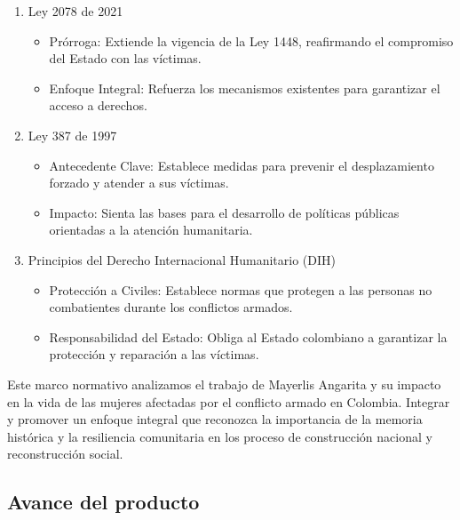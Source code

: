 \documentclass[letterpaper, 12pt]{article}
\begin{document}
\begin{enumerate}
      \item Ley 2078 de 2021
            \begin{itemize}
                  \item Prórroga: Extiende la vigencia de la Ley 1448, reafirmando el compromiso del
                        Estado con las víctimas.
                  \item Enfoque Integral: Refuerza los mecanismos existentes para garantizar el acceso
                        a derechos.
            \end{itemize}

      \item Ley 387 de 1997
            \begin{itemize}
                  \item Antecedente Clave: Establece medidas para prevenir el desplazamiento forzado y
                        atender a sus víctimas.
                  \item Impacto: Sienta las bases para el desarrollo de políticas públicas orientadas a
                        la atención humanitaria.
            \end{itemize}

      \item Principios del Derecho Internacional Humanitario (DIH)
            \begin{itemize}
                  \item Protección a Civiles: Establece normas que protegen a las personas no
                        combatientes durante los conflictos armados.
                  \item Responsabilidad del Estado: Obliga al Estado colombiano a garantizar la
                        protección y reparación a las víctimas.
            \end{itemize}
\end{enumerate}

Este marco normativo analizamos el trabajo de Mayerlis Angarita y su impacto en
la vida de las mujeres afectadas por el conflicto armado en Colombia. Integrar
y promover un enfoque integral que reconozca la importancia de la memoria
histórica y la resiliencia comunitaria en los proceso de construcción nacional
y reconstrucción social.

\subsection*{Avance del producto}
\end{document}
